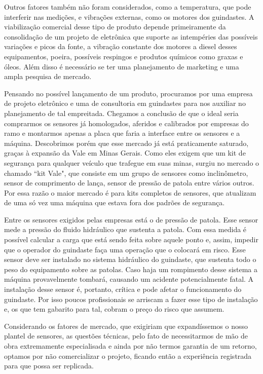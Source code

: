 \documentclass[a4paper,12pt]{article}
\begin{document}
Outros fatores também não foram considerados, como a temperatura, que pode interferir nas medições, e vibrações externas, como os motores dos guindastes. A viabilização comercial desse tipo de produto depende primeiramente da consolidação de um projeto de eletrônica que suporte as intempéries das possíveis variações e picos da fonte, a vibração constante dos motores a diesel desses equipamentos, poeira, possíveis respingos e produtos químicos como graxas e óleos. Além disso é necessário se ter uma planejamento de marketing e uma ampla pesquisa de mercado. 

Pensando no possível lançamento de um produto, procuramos por uma empresa de projeto eletrônico e uma de consultoria em guindastes para nos auxiliar no planejamento de tal empreitada. Chegamos a conclusão de que o ideal seria comprarmos os sensores já homologados, aferidos e calibrados por empresas do ramo e montarmos apenas a placa que faria a interface entre os sensores e a máquina. Descobrimos porém que esse mercado já está praticamente saturado, graças à expansão da Vale em Minas Gerais. Como eles exigem que um kit de segurança para qualquer veículo que trafegue em suas minas, surgiu no mercado o chamado ``kit Vale", que consiste em um grupo de sensores como inclinômetro, sensor de comprimento de lança, sensor de pressão de patola entre vários outros. Por essa razão o maior mercado é para kits completos de sensores, que atualizam de uma só vez uma máquina que estava fora dos padrões de segurança.

Entre os sensores exigidos pelas empresas está o de pressão de patola. Esse sensor mede a pressão do fluido hidráulico que sustenta a patola. Com essa medida é possível calcular a carga que está sendo feita sobre aquele ponto e, assim, impedir que o operador do guindaste faça uma operação que o colocará em risco. Esse sensor deve ser instalado no sistema hidráulico do guindaste, que sustenta todo o peso do equipamento sobre as patolas. Caso haja um rompimento desse sistema a máquina provavelmente tombará, causando um acidente potencialmente fatal. A instalação desse sensor é, portanto, crítica e pode afetar o funcionamento do guindaste. Por isso poucos profissionais se arriscam a fazer esse tipo de instalação e, os que tem gabarito para tal, cobram o preço do risco que assumem.

Considerando os fatores de mercado, que exigiriam que expandíssemos o nosso plantel de sensores, as questões técnicas, pelo fato de necessitarmos de mão de obra extremamente especialisada e ainda por não termos garantia de um retorno, optamos por não comercializar o projeto, ficando então a experiência registrada para que possa ser replicada.
\end{document}
